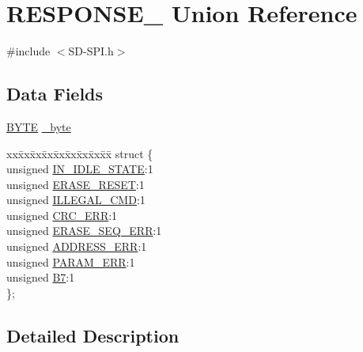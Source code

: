 \hypertarget{union_r_e_s_p_o_n_s_e__1}{}\section{R\+E\+S\+P\+O\+N\+S\+E\+\_ Union Reference}
\label{union_r_e_s_p_o_n_s_e__1}


{\ttfamily \#include $<$S\+D-\/\+S\+P\+I.\+h$>$}

\subsection*{Data Fields}
\begin{DoxyCompactItemize}
\item 
\hyperlink{_generic_type_defs_8h_a4ae1dab0fb4b072a66584546209e7d58}{B\+Y\+T\+E} \hyperlink{union_r_e_s_p_o_n_s_e__1_aad6b25752650539bbd15773c4b71b4d4}{\+\_\+byte}
\item 
\begin{tabbing}
xx\=xx\=xx\=xx\=xx\=xx\=xx\=xx\=xx\=\kill
struct \{\\
\>unsigned \hyperlink{union_r_e_s_p_o_n_s_e__1_aacd57ecac9535b8bbec237cd7b8f1d5b}{IN\_IDLE\_STATE}:1\\
\>unsigned \hyperlink{union_r_e_s_p_o_n_s_e__1_a732e20ed50aafc3cc46fea840b0db62a}{ERASE\_RESET}:1\\
\>unsigned \hyperlink{union_r_e_s_p_o_n_s_e__1_ad0ff111a5b1536c0a0929f4d4abe187f}{ILLEGAL\_CMD}:1\\
\>unsigned \hyperlink{union_r_e_s_p_o_n_s_e__1_a5398e0947b8fd503827274978d3b6944}{CRC\_ERR}:1\\
\>unsigned \hyperlink{union_r_e_s_p_o_n_s_e__1_a9b3e70b8700e18c59f4ef0a7aa636b9a}{ERASE\_SEQ\_ERR}:1\\
\>unsigned \hyperlink{union_r_e_s_p_o_n_s_e__1_a245b3cd89542e3152c04b924b8aa2446}{ADDRESS\_ERR}:1\\
\>unsigned \hyperlink{union_r_e_s_p_o_n_s_e__1_a22dcbf2add4c812de207ef9a507758e3}{PARAM\_ERR}:1\\
\>unsigned \hyperlink{union_r_e_s_p_o_n_s_e__1_afc348e9a96bdf6c375205eb63ce6ab06}{B7}:1\\
\}; \\

\end{tabbing}\end{DoxyCompactItemize}


\subsection{Detailed Description}


